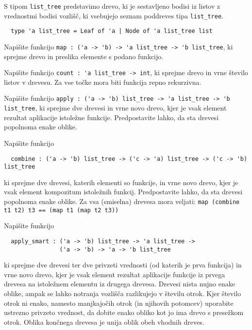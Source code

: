 \documentclass[arhiv]{../izpit}
\begin{document}

\naloga

S tipom \verb|list_tree| predstavimo drevo, ki je sestavljeno bodisi iz listov z vrednostmi bodisi vozlišč, ki vsebujejo seznam poddreves tipa \verb|list_tree|.

\begin{verbatim}
  type 'a list_tree = Leaf of 'a | Node of 'a list_tree list
\end{verbatim}

\podnaloga
Napišite funkcijo \verb|map : ('a -> 'b) -> 'a list_tree -> 'b list_tree|, ki sprejme drevo in preslika elemente s podano funkcijo. 

\podnaloga
Napišite funkcijo \verb|count : 'a list_tree -> int|, ki sprejme drevo in vrne število listov v drevesu. Za vse točke mora biti funkcija repno rekurzivna.

\podnaloga
Napišite funkcijo \verb|apply : ('a -> 'b) list_tree -> 'a list_tree -> 'b list_tree|, ki sprejme dve drevesi in vrne novo drevo, kjer je vsak element rezultat aplikacije istoležne funkcije. Predpostavite lahko, da sta drevesi popolnoma enake oblike.

\podnaloga
Napišite funkcijo
\begin{verbatim}
  combine : ('a -> 'b) list_tree -> ('c -> 'a) list_tree -> ('c -> 'b) list_tree
\end{verbatim}
ki sprejme dve drevesi, katerih elementi so funkcije, in vrne novo drevo, kjer je vsak element kompozitum istoležnih funkcij. Predpostavite lahko, da sta drevesi popolnoma enake oblike. Za vsa (smiselna) drevesa mora veljati: \verb|map (combine t1 t2) t3 == (map t1 (map t2 t3))|

\podnaloga
Napišite funkcijo
\begin{verbatim}
  apply_smart : ('a -> 'b) list_tree -> 'a list_tree ->
                ('a -> 'b) -> 'a -> 'b list_tree
\end{verbatim}
ki sprejme dve drevesi ter dve privzeti vrednosti (od katerih je prva funkcija) in vrne novo drevo, kjer je vsak element rezultat aplikacije funkcije iz prvega drevesa na istoležnem elementu iz drugega drevesa. Drevesi nista nujno enake oblike, ampak se lahko notranja vozlišča razlikujejo v številu otrok. Kjer število otrok ni enako, namesto manjkajočih otrok (in njihovih potomcev) uporabite ustrezno privzeto vrednost, da dobite enako obliko kot jo ima drevo s presežkom otrok. Oblika končnega drevesa je unija oblik obeh vhodnih dreves.
\end{document}
